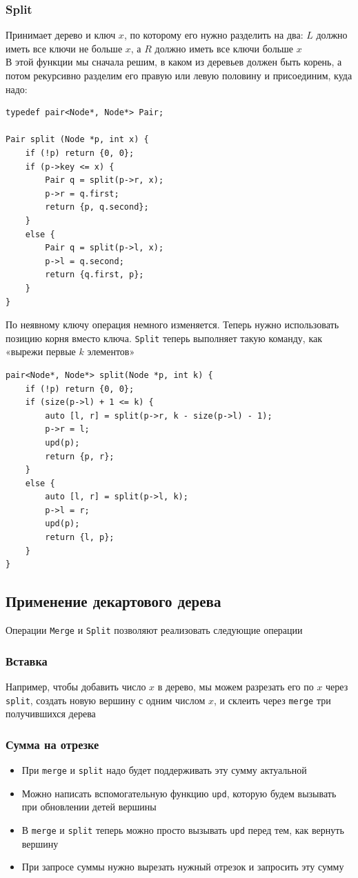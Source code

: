 \documentclass[a4paper]{article}
\newcommand{\code}[1]{\colorbox{codegray}{\texttt{#1}}}
\begin{document}
\subsubsection{Split}
Принимает дерево и ключ $x$, по которому его нужно разделить на два: $L$ должно иметь все ключи не больше $x$, а $R$ должно иметь все ключи больше $x$\\[2mm]
\indent В этой функции мы сначала решим, в каком из деревьев должен быть корень, а потом рекурсивно разделим его правую или левую половину и присоединим, куда надо:
\begin{lstlisting}
typedef pair<Node*, Node*> Pair;

Pair split (Node *p, int x) {
    if (!p) return {0, 0};
    if (p->key <= x) {
        Pair q = split(p->r, x);
        p->r = q.first;
        return {p, q.second};
    }
    else {
        Pair q = split(p->l, x);
        p->l = q.second;
        return {q.first, p};
    }
}
\end{lstlisting}
По неявному ключу операция немного изменяется. Теперь нужно использовать позицию корня вместо ключа. \code{Split} теперь выполняет такую команду, как «вырежи первые $k$ элементов»
\begin{lstlisting}
pair<Node*, Node*> split(Node *p, int k) {
    if (!p) return {0, 0};
    if (size(p->l) + 1 <= k) {
        auto [l, r] = split(p->r, k - size(p->l) - 1);
        p->r = l;
        upd(p);
        return {p, r};
    }
    else {
        auto [l, r] = split(p->l, k);
        p->l = r;
        upd(p);
        return {l, p};
    }
}
\end{lstlisting}

\subsection{Применение декартового дерева}
Операции \code{Merge} и \code{Split} позволяют реализовать следующие операции
\subsubsection{Вставка}
Например, чтобы добавить число $x$ в дерево, мы можем разрезать его по $x$ через \code{split}, создать новую вершину с одним числом $x$, и склеить через \code{merge} три получившихся дерева

\subsubsection{Сумма на отрезке}
\begin{itemize}
    \item При \code{merge} и \code{split} надо будет поддерживать эту сумму актуальной
    \item Можно написать вспомогательную функцию \code{upd}, которую будем вызывать при обновлении детей вершины
    \item В \code{merge} и \code{split} теперь можно просто вызывать \code{upd} перед тем, как вернуть вершину
    \item При запросе суммы нужно вырезать нужный отрезок и запросить эту сумму
\end{itemize}
\end{document}
